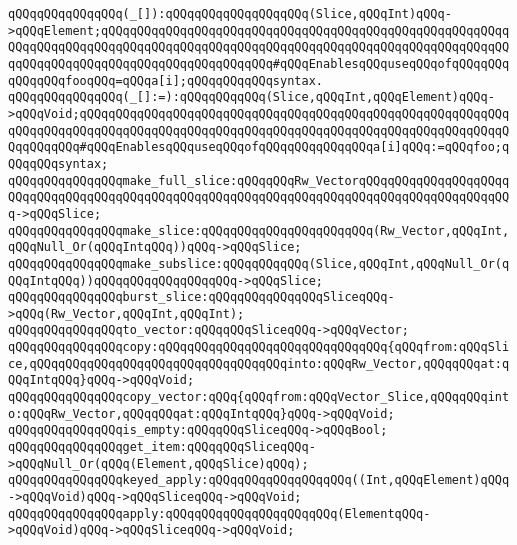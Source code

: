 \verb|qQQqqQQqqQQqqQQq(_[]):qQQqqQQqqQQqqQQqqQQq(Slice,qQQqInt)qQQq->qQQqElement;qQQqqQQqqQQqqQQqqQQqqQQqqQQqqQQqqQQqqQQqqQQqqQQqqQQqqQQqqQQqqQQqqQQqqQQqqQQqqQQqqQQqqQQqqQQqqQQqqQQqqQQqqQQqqQQqqQQqqQQqqQQqqQQqqQQqqQQqqQQqqQQqqQQqqQQqqQQqqQQqqQQq#qQQqEnablesqQQquseqQQqofqQQqqQQqqQQqqQQqfooqQQq=qQQqa[i];qQQqqQQqqQQqsyntax.|\newline
\verb|qQQqqQQqqQQqqQQq(_[]:=):qQQqqQQqqQQq(Slice,qQQqInt,qQQqElement)qQQq->qQQqVoid;qQQqqQQqqQQqqQQqqQQqqQQqqQQqqQQqqQQqqQQqqQQqqQQqqQQqqQQqqQQqqQQqqQQqqQQqqQQqqQQqqQQqqQQqqQQqqQQqqQQqqQQqqQQqqQQqqQQqqQQqqQQqqQQqqQQqqQQqqQQq#qQQqEnablesqQQquseqQQqofqQQqqQQqqQQqqQQqa[i]qQQq:=qQQqfoo;qQQqqQQqsyntax;|\newline
\newline
\verb|qQQqqQQqqQQqqQQqmake_full_slice:qQQqqQQqRw_VectorqQQqqQQqqQQqqQQqqQQqqQQqqQQqqQQqqQQqqQQqqQQqqQQqqQQqqQQqqQQqqQQqqQQqqQQqqQQqqQQqqQQqqQQqqQQq->qQQqSlice;|\newline
\verb|qQQqqQQqqQQqqQQqmake_slice:qQQqqQQqqQQqqQQqqQQqqQQq(Rw_Vector,qQQqInt,qQQqNull_Or(qQQqIntqQQq))qQQq->qQQqSlice;|\newline
\verb|qQQqqQQqqQQqqQQqmake_subslice:qQQqqQQqqQQq(Slice,qQQqInt,qQQqNull_Or(qQQqIntqQQq))qQQqqQQqqQQqqQQqqQQq->qQQqSlice;|\newline
\newline
\verb|qQQqqQQqqQQqqQQqburst_slice:qQQqqQQqqQQqqQQqSliceqQQq->qQQq(Rw_Vector,qQQqInt,qQQqInt);|\newline
\verb|qQQqqQQqqQQqqQQqto_vector:qQQqqQQqSliceqQQq->qQQqVector;|\newline
\newline
\verb|qQQqqQQqqQQqqQQqcopy:qQQqqQQqqQQqqQQqqQQqqQQqqQQqqQQq{qQQqfrom:qQQqSlice,qQQqqQQqqQQqqQQqqQQqqQQqqQQqqQQqqQQqinto:qQQqRw_Vector,qQQqqQQqat:qQQqIntqQQq}qQQq->qQQqVoid;|\newline
\verb|qQQqqQQqqQQqqQQqcopy_vector:qQQq{qQQqfrom:qQQqVector_Slice,qQQqqQQqinto:qQQqRw_Vector,qQQqqQQqat:qQQqIntqQQq}qQQq->qQQqVoid;|\newline
\newline
\verb|qQQqqQQqqQQqqQQqis_empty:qQQqqQQqSliceqQQq->qQQqBool;|\newline
\verb|qQQqqQQqqQQqqQQqget_item:qQQqqQQqSliceqQQq->qQQqNull_Or(qQQq(Element,qQQqSlice)qQQq);|\newline
\newline
\verb|qQQqqQQqqQQqqQQqkeyed_apply:qQQqqQQqqQQqqQQqqQQq((Int,qQQqElement)qQQq->qQQqVoid)qQQq->qQQqSliceqQQq->qQQqVoid;|\newline
\verb|qQQqqQQqqQQqqQQqapply:qQQqqQQqqQQqqQQqqQQqqQQq(ElementqQQq->qQQqVoid)qQQq->qQQqSliceqQQq->qQQqVoid;|\newline
